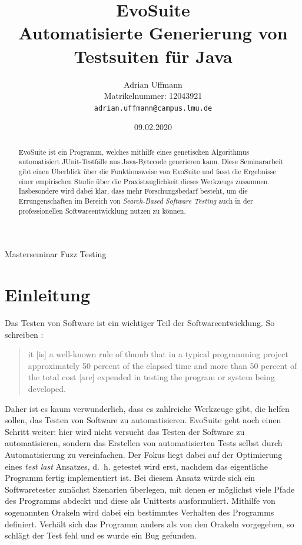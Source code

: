 \documentclass[a4paper,11pt]{article}
\title{\textbf{EvoSuite}\\
Automatisierte Generierung von Testsuiten für Java}
\author{Adrian Uffmann\\
Matrikelnummer: 12043921\\
\texttt{adrian.uffmann@campus.lmu.de}}
\date{09.02.2020}
\begin{document}
\maketitle

\begin{center}
Masterseminar Fuzz Testing
\end{center}

\begin{abstract}
EvoSuite ist ein Programm, welches mithilfe eines genetischen Algorithmus automatisiert JUnit-Testfälle aus Java-Bytecode generieren kann.
Diese Seminararbeit gibt einen Überblick über die Funktionsweise von EvoSuite und fasst die Ergebnisse einer empirischen Studie über die Praxistauglichkeit dieses Werkzeugs zusammen.
Insbesondere wird dabei klar, dass mehr Forschungsbedarf besteht, um die Errungenschaften im Bereich von \textit{Search-Based Software Testing} auch in der professionellen Softwareentwicklung nutzen zu können.
\end{abstract}

\section{Einleitung}

Das Testen von Software ist ein wichtiger Teil der Softwareentwicklung.
So schreiben \citet{myers2004art}:
\begin{quote}
it [is] a well-known rule of thumb that in a typical programming project approximately 50 percent of the elapsed time and more than 50 percent of the total cost [are] expended in testing the program or system being developed.
\end{quote}
Daher ist es kaum verwunderlich, dass es zahlreiche Werkzeuge gibt, die helfen sollen, das Testen von Software zu automatisieren.
EvoSuite geht noch einen Schritt weiter: hier wird nicht versucht das Testen der Software zu automatisieren, sondern das Erstellen von automatisierten Tests selbst durch Automatisierung zu vereinfachen.
Der Fokus liegt dabei auf der Optimierung eines \textit{test last} Ansatzes, d.~h. getestet wird erst, nachdem das eigentliche Programm fertig implementiert ist.
Bei diesem Ansatz würde sich ein Softwaretester zunächst Szenarien überlegen, mit denen er möglichst viele Pfade des Programms abdeckt und diese als Unittests ausformuliert.
Mithilfe von sogenannten Orakeln wird dabei ein bestimmtes Verhalten des Programms definiert.
Verhält sich das Programm anders als von den Orakeln vorgegeben, so schlägt der Test fehl und es wurde ein Bug gefunden.
\end{document}
